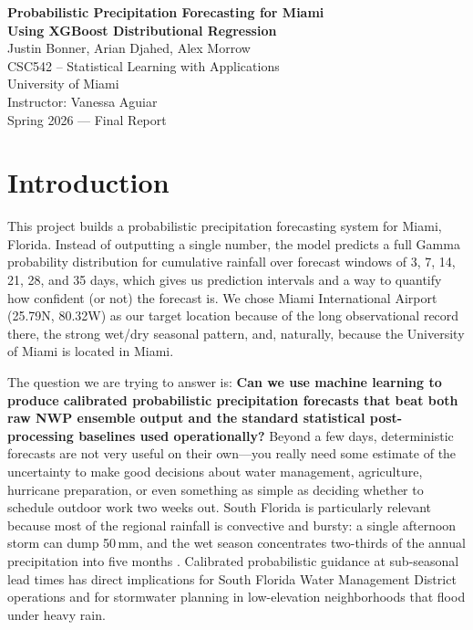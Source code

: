 \documentclass[11pt]{article}
\begin{document}
\begin{center}
    {\LARGE \textbf{Probabilistic Precipitation Forecasting for Miami\\Using XGBoost Distributional Regression}}\\[1.5em]
    {\large Justin Bonner, Arian Djahed, Alex Morrow}\\[0.5em]
    CSC542 -- Statistical Learning with Applications\\
    University of Miami\\
    Instructor: Vanessa Aguiar\\[0.5em]
    Spring 2026 --- Final Report
\end{center}
\vspace{1em}

\section{Introduction}

This project builds a probabilistic precipitation forecasting system for Miami, Florida. Instead of outputting a single number, the model predicts a full Gamma probability distribution for cumulative rainfall over forecast windows of 3, 7, 14, 21, 28, and 35 days, which gives us prediction intervals and a way to quantify how confident (or not) the forecast is. We chose Miami International Airport (25.79\textdegree N, 80.32\textdegree W) as our target location because of the long observational record there, the strong wet/dry seasonal pattern, and, naturally, because the University of Miami is located in Miami.

The question we are trying to answer is: \textbf{Can we use machine learning to produce calibrated probabilistic precipitation forecasts that beat both raw NWP ensemble output and the standard statistical post-processing baselines used operationally?} Beyond a few days, deterministic forecasts are not very useful on their own---you really need some estimate of the uncertainty to make good decisions about water management, agriculture, hurricane preparation, or even something as simple as deciding whether to schedule outdoor work two weeks out. South Florida is particularly relevant because most of the regional rainfall is convective and bursty: a single afternoon storm can dump 50\,mm, and the wet season concentrates two-thirds of the annual precipitation into five months \citep{misra2011}. Calibrated probabilistic guidance at sub-seasonal lead times has direct implications for South Florida Water Management District operations and for stormwater planning in low-elevation neighborhoods that flood under heavy rain.
\end{document}
